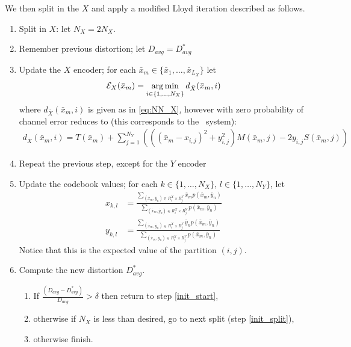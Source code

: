 We then split in the $X$ and apply a modified Lloyd iteration described as follows.
\begin{enumerate}
    
    \item \label{init_split} Split in $X$: let $N_X=2N_X$.
    \item \label{init_start} Remember previous distortion; let $D_{avg}=D^*_{avg}$
    \item Update the $X$ encoder; for each $\bar x_m\in\{\bar x_1,\ldots,\bar x_{L_X}\}$ let
    \begin{align}
        \mathcal E_X(\bar x_m) = \operatorname*{arg\,min}_{i \in \{1,\dots,N_X\}}d_{\bar X}(\bar x_m,i)
    \end{align}
    where $d_{\bar X}(\bar x_m,i)$ is given as in \eqref{eq:NN_X}, however with zero probability of channel error reduces to (this corresponds to the \sysIJ\ system):
    \begin{align}
        \label{eq:no_channel_NN_X}
        d_{\bar X}(\bar x_m,i) =
            T(\bar x_m) + 
            \sum_{j=1}^{N_Y}
            \left(\left({(\bar x_m-x_{i,j})}^2 +
            y_{i,j}^2\right)M(\bar x_m, j) -2y_{i,j}S(\bar x_m, j)\right)
    \end{align}
    \item Repeat the previous step, except for the $Y$ encoder
    \item Update the codebook values; for each $k\in \{1,\ldots,N_X\}$, $l\in\{1,\ldots,N_Y\}$, let
    \begin{align}
        x_{k,l} &= 
            \frac{\sum_{(\bar x_m,\bar y_n)\in R_i^X\times R_j^Y}\bar x_m p(\bar x_m,\bar y_n)}
            {\sum_{(\bar x_m,\bar y_n)\in R_i^X\times R_j^Y}p(\bar x_m,\bar y_n)} \\
        y_{k,l} &= 
            \frac{\sum_{(\bar x_m,\bar y_n)\in R_i^X\times R_j^Y}\bar y_n p(\bar x_m,\bar y_n)}
            {\sum_{(\bar x_m,\bar y_n)\in R_i^X\times R_j^Y}p(\bar x_m,\bar y_n)}
    \end{align}
    Notice that this is the expected value of the partition $(i,j)$.
    \item Compute the new distortion $D^*_{avg}$.
    \begin{enumerate}
        \item
        If
        $\frac
        {(D_{avg} - D^*_{avg})}
        {D_{avg}}
        > \delta$
        then return to step \ref{init_start},
        \item
        otherwise if $N_X$ is less than desired, go to next split (step \ref{init_split}),
        \item
        otherwise finish.
    \end{enumerate}
\end{enumerate}

